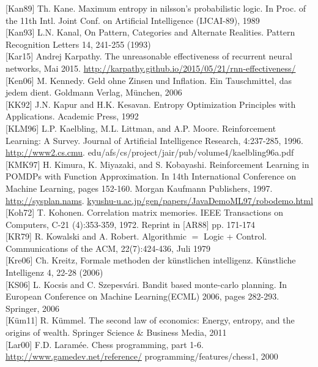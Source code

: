 \documentclass[10pt]{article}
\begin{document}
[Kan89] Th. Kane. Maximum entropy in nilsson's probabilistic logic. In Proc. of the 11th Intl. Joint Conf. on Artificial Intelligence (IJCAI-89), 1989\\[0pt]
[Kan93] L.N. Kanal, On Pattern, Categories and Alternate Realities. Pattern Recognition Letters 14, 241-255 (1993)\\[0pt]
[Kar15] Andrej Karpathy. The unreasonable effectiveness of recurrent neural networks, Mai 2015. \href{http://karpathy.github.io/2015/05/21/rnn-effectiveness/}{http://karpathy.github.io/2015/05/21/rnn-effectiveness/}\\[0pt]
[Ken06] M. Kennedy. Geld ohne Zinsen und Inflation. Ein Tauschmittel, das jedem dient. Goldmann Verlag, München, 2006\\[0pt]
[KK92] J.N. Kapur and H.K. Kesavan. Entropy Optimization Principles with Applications. Academic Press, 1992\\[0pt]
[KLM96] L.P. Kaelbling, M.L. Littman, and A.P. Moore. Reinforcement Learning: A Survey. Journal of Artificial Intelligence Research, 4:237-285, 1996. \href{http://www2.cs.cmu}{http://www2.cs.cmu}. edu/afs/cs/project/jair/pub/volume4/kaelbling96a.pdf\\[0pt]
[KMK97] H. Kimura, K. Miyazaki, and S. Kobayashi. Reinforcement Learning in POMDPs with Function Approximation. In 14th International Conference on Machine Learning, pages 152-160. Morgan Kaufmann Publishers, 1997. \href{http://sysplan.nams}{http://sysplan.nams}. \href{http://kyushu-u.ac.jp/gen/papers/JavaDemoML97/robodemo.html}{kyushu-u.ac.jp/gen/papers/JavaDemoML97/robodemo.html}\\[0pt]
[Koh72] T. Kohonen. Correlation matrix memories. IEEE Transactions on Computers, C-21 (4):353-359, 1972. Reprint in [AR88] pp. 171-174\\[0pt]
[KR79] R. Kowalski and A. Robert. Algorithmic $=$ Logic + Control. Communications of the ACM, 22(7):424-436, Juli 1979\\[0pt]
[Kre06] Ch. Kreitz, Formale methoden der künstlichen intelligenz. Künstliche Intelligenz 4, 22-28 (2006)\\[0pt]
[KS06] L. Kocsis and C. Szepesvári. Bandit based monte-carlo planning. In European Conference on Machine Learning(ECML) 2006, pages 282-293. Springer, 2006\\[0pt]
[Küm11] R. Kümmel. The second law of economics: Energy, entropy, and the origins of wealth. Springer Science \& Business Media, 2011\\[0pt]
[Lar00] F.D. Laramée. Chess programming, part 1-6. \href{http://www.gamedev.net/reference/}{http://www.gamedev.net/reference/} programming/features/chess1, 2000\\[0pt]
\end{document}

